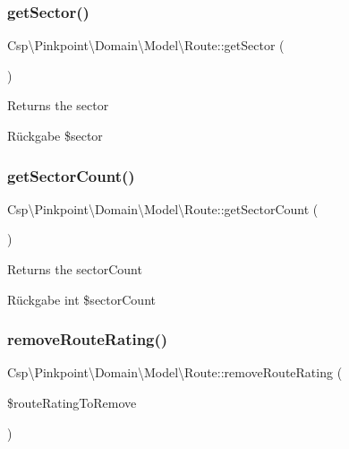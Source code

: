 \subsubsection{\texorpdfstring{get\+Sector()}{getSector()}}
{\footnotesize\ttfamily Csp\textbackslash{}\+Pinkpoint\textbackslash{}\+Domain\textbackslash{}\+Model\textbackslash{}\+Route\+::get\+Sector (\begin{DoxyParamCaption}{ }\end{DoxyParamCaption})}

Returns the sector

\begin{DoxyReturn}{Rückgabe}
\$sector 
\end{DoxyReturn}
\mbox{\label{classCsp_1_1Pinkpoint_1_1Domain_1_1Model_1_1Route_a49f993dde1a86d32c24c9897ff008478}} 
\subsubsection{\texorpdfstring{get\+Sector\+Count()}{getSectorCount()}}
{\footnotesize\ttfamily Csp\textbackslash{}\+Pinkpoint\textbackslash{}\+Domain\textbackslash{}\+Model\textbackslash{}\+Route\+::get\+Sector\+Count (\begin{DoxyParamCaption}{ }\end{DoxyParamCaption})}

Returns the sector\+Count

\begin{DoxyReturn}{Rückgabe}
int \$sector\+Count 
\end{DoxyReturn}
\mbox{\label{classCsp_1_1Pinkpoint_1_1Domain_1_1Model_1_1Route_ad3cf96424734ce37a8d2fd0d41139c74}} 
\subsubsection{\texorpdfstring{remove\+Route\+Rating()}{removeRouteRating()}}
{\footnotesize\ttfamily Csp\textbackslash{}\+Pinkpoint\textbackslash{}\+Domain\textbackslash{}\+Model\textbackslash{}\+Route\+::remove\+Route\+Rating (\begin{DoxyParamCaption}\item[{\textbackslash{}\hyperlink{classCsp_1_1Pinkpoint_1_1Domain_1_1Model_1_1RouteRating}{Csp\textbackslash{}\+Pinkpoint\textbackslash{}\+Domain\textbackslash{}\+Model\textbackslash{}\+Route\+Rating}}]{\$route\+Rating\+To\+Remove }\end{DoxyParamCaption})}

